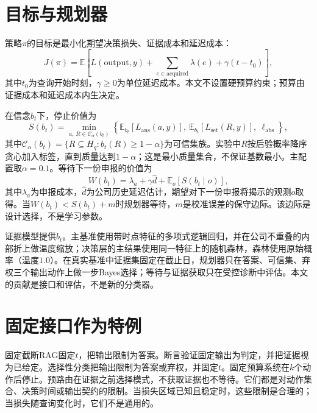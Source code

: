 \documentclass[12pt,openany]{ctexbook}
\newcommand{\E}{\mathbb{E}}
\begin{document}
\section{目标与规划器}
策略$\pi$的目标是最小化期望决策损失、证据成本和延迟成本：
\begin{equation}
J(\pi)=\E\left[L(\text{output},y)+\sum_{e\in\text{acquired}}\lambda(e)+\gamma(t-t_0)\right],
\end{equation}
其中$t_0$为查询开始时刻，$\gamma\ge0$为单位延迟成本。本文不设置硬预算约束；预算由证据成本和延迟成本内生决定。\par
在信念$b_t$下，停止价值为
\begin{equation}
S(b_t)=\min_{a,\,R\in\mathcal{C}_\alpha(b_t)}
\left\{\E_{b_t}[L_{\text{ans}}(a,y)],\ \E_{b_t}[L_{\text{set}}(R,y)],\ \ell_{\text{abs}}\right\},
\end{equation}
其中$\mathcal{C}_\alpha(b_t)=\{R\subseteq H_q:b_t(R)\ge1-\alpha\}$为可信集族。实验中$R$按后验概率降序贪心加入标签，直到质量达到$1-\alpha$；这是最小质量集合，不保证基数最小。主配置取$\alpha=0.1$。等待下一份申报的价值为
\begin{equation}
W(b_t)=\lambda_a+\gamma\hat d+\E_{o}[S(b_t\mid o)],
\end{equation}
其中$\lambda_a$为申报成本，$\hat d$为公司历史延迟估计，期望对下一份申报将揭示的观测$o$取得。当$W(b_t)<S(b_t)+m$时规划器等待，$m$是校准误差的保守边际。该边际是设计选择，不是学习参数。\par
证据模型提供$b_t$。主基准使用带时点特征的多项式逻辑回归，并在公司不重叠的内部折上做温度缩放；决策层的主结果使用同一特征上的随机森林，森林使用原始概率（温度$1.0$）。在真实基准中证据集固定在截止日，规划器只在答案、可信集、弃权三个输出动作上做一步Bayes选择；等待与证据获取只在受控诊断中评估。本文的贡献是接口和评估，不是新的分类器。\par

\section{固定接口作为特例}
固定截断RAG固定$t$，把输出限制为答案。断言验证固定输出为判定，并把证据视为已给定。选择性分类把输出限制为答案或弃权，并固定$t$。固定预算系统在$k$个动作后停止。预路由在证据之前选择模式，不获取证据也不等待。它们都是对动作集合、决策时间或输出契约的限制。当损失区域已知且稳定时，这些限制是合理的；当损失随查询变化时，它们不是通用的。\par
\end{document}
